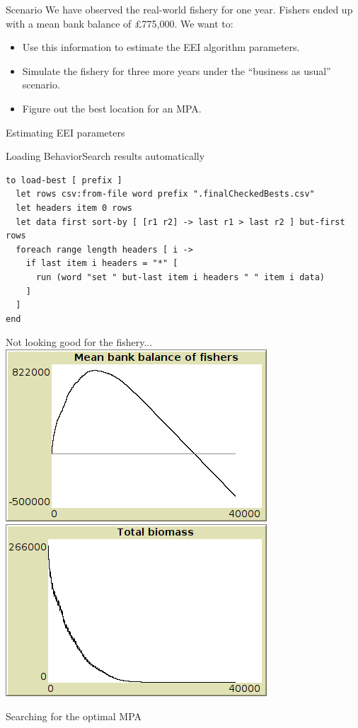 \documentclass[table, 14pt, aspectratio=169]{beamer}
\begin{document}
\begin{frame}{Scenario}
  \vfill
  We have observed the real-world fishery for one year.
  \vfill
  Fishers ended up with a mean bank balance of £775,000.
  \vfill
  We want to:
  \vfill
  \begin{itemize}
    \item Use this information to estimate the EEI algorithm parameters.
    \vfill
    \item Simulate the fishery for three more years under the ``business as usual'' scenario.
    \vfill
    \item Figure out the best location for an MPA.
  \end{itemize}
  \vfill
\end{frame}

\begin{frame}{Estimating EEI parameters}
    


\end{frame}


\begin{frame}[fragile=singleslide]{Loading BehaviorSearch results automatically}
  \begin{adjustbox}{max height=0.8\textheight, max width = \linewidth}
    \begin{verbatim}  
to load-best [ prefix ]
  let rows csv:from-file word prefix ".finalCheckedBests.csv"
  let headers item 0 rows
  let data first sort-by [ [r1 r2] -> last r1 > last r2 ] but-first rows
  foreach range length headers [ i ->
    if last item i headers = "*" [
      run (word "set " but-last item i headers " " item i data)
    ]
  ]
end
    \end{verbatim}
  \end{adjustbox}
\end{frame}

\begin{frame}{Not looking good for the fishery...}
  \includegraphics[width=0.49\linewidth]{images/business-as-usual-balance.png}
  \hfill
  \includegraphics[width=0.49\linewidth]{images/business-as-usual-biomass.png}
\end{frame}

\begin{frame}{Searching for the optimal MPA}
  
\end{frame}
\end{document}
